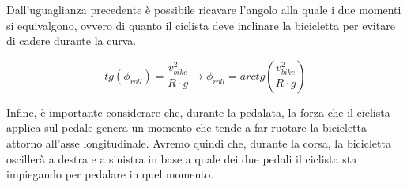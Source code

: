 \documentclass[class=article]{standalone}
\begin{document}
	Dall'uguaglianza precedente è possibile ricavare l'angolo alla quale i due momenti si equivalgono, ovvero di quanto il ciclista deve inclinare la bicicletta per evitare di cadere durante la curva.
	
	\[tg(\phi_{roll})=\frac{v_{bike}^2}{R\cdot g} \rightarrow \phi_{roll}=arctg\left(\frac{v_{bike}^2}{R\cdot g}\right)\]
	
	Infine, è importante considerare che, durante la pedalata, la forza che il ciclista applica sul pedale genera un momento che tende a far ruotare la bicicletta attorno all'asse longitudinale. Avremo quindi che, durante la corsa, la bicicletta oscillerà a destra e a sinistra in base a quale dei due pedali il ciclista sta impiegando per pedalare in quel momento.
	
	
	
\end{document}
